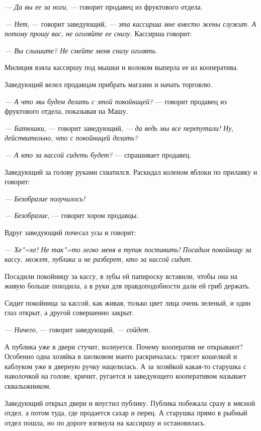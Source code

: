 \textit{--- Да вы ее за ноги}, --- говорит продавец из фруктового отдела.

\textit{--- Нет}, --- говорит заведующий, \textit{--- эта кассирша мне вместо жены служит. А потому прошу вас, не оголяйте ее снизу.}
Кассирша говорит:

\textit{--- Вы слышите? Не смейте меня снизу оголять.}

Милиция взяла кассиршу под мышки и волоком выперла ее из кооператива.

Заведующий велел продавцам прибрать магазин и начать торговлю.

\textit{--- А что мы будем делать с этой покойницей?} --- говорит продавец из фруктового отдела, показывая на Машу.

\textit{--- Батюшки}, --- говорит заведующий, \textit{--- да ведь мы все перепутали! Ну, действительно, что с покойницей делать?}

\textit{--- А кто за кассой сидеть будет?} --- спрашивает продавец.

Заведующий за голову руками схватился. Раскидал коленом яблоки по прилавку и говорит:

\textit{--- Безобразие получилось!}

\textit{--- Безобразие}, --- говорит хором продавцы.

Вдруг заведующий почесал усы и говорит:

\textit{--- Хе"=хе! Не так"=то легко меня в тупик поставить! Посадим покойницу за кассу, может, публика и не разберет, кто за кассой сидит.}

Посадили покойницу за кассу, в зубы ей папироску вставили, чтобы она на живую больше походила, а в руки для правдоподобности дали ей гриб держать.

Сидит покойница за кассой, как живая, только цвет лица очень зеленый, и один глаз открыт, а другой совершенно закрыт.

\textit{--- Ничего}, --- говорит заведующий, \textit{--- сойдет.}

А публика уже в двери стучит, волнуется. Почему кооператив не открывают? Особенно одна хозяйка в шелковом манто раскричалась: трясет кошелкой и каблуком уже в дверную ручку нацелилась. А за хозяйкой какая-то старушка с наволочкой на голове, кричит, ругается и заведующего кооперативом называет сквалыжником.

Заведующий открыл двери и впустил публику. Публика побежала сразу в мясной отдел, а потом туда, где продается сахар и перец. А старушка прямо в рыбный отдел пошла, но по дороге взгянула на кассиршу и остановилась.

